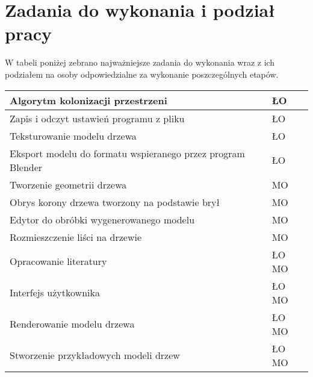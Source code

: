 \section{Zadania do wykonania i podział pracy}
W tabeli poniżej zebrano najważniejsze zadania do wykonania wraz z ich podziałem na osoby odpowiedzialne
za wykonanie poszczególnych etapów.
\begin{center}    
    \begin{longtable}{|p{120mm}|p{16mm}|} \hline
    Algorytm kolonizacji przestrzeni & ŁO \\ \hline
    Zapis i odczyt ustawień programu z pliku  & ŁO \\ \hline
    Teksturowanie modelu drzewa & ŁO \\ \hline
    Eksport modelu do formatu wspieranego przez program Blender & ŁO \\ \hline
    \hline
    Tworzenie geometrii drzewa & MO \\ \hline
    Obrys korony drzewa tworzony na podstawie brył & MO \\ \hline
    Edytor do obróbki wygenerowanego modelu  & MO \\ \hline
    Rozmieszczenie liści na drzewie & MO \\ \hline
    \hline
    Opracowanie literatury & ŁO MO  \\  \hline
    Interfejs użytkownika & ŁO MO \\ \hline
    Renderowanie modelu drzewa & ŁO MO \\ \hline
    Stworzenie przykładowych modeli drzew & ŁO MO \\ \hline
    \end{longtable}
\end{center}


\newpage
